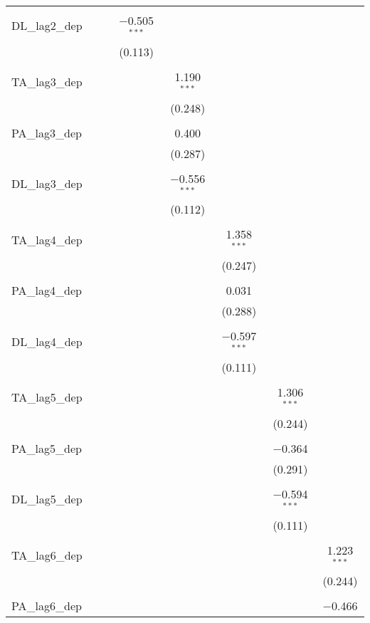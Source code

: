 \begin{table}[!htbp]
\begin{tabular}{@{\extracolsep{5pt}}lccccccc}
  & & & & & & & \\ 
 DL\_lag2\_dep &  &  & $-$0.505$^{***}$ &  &  &  &  \\ 
  &  &  & (0.113) &  &  &  &  \\ 
  & & & & & & & \\ 
 TA\_lag3\_dep &  &  &  & 1.190$^{***}$ &  &  &  \\ 
  &  &  &  & (0.248) &  &  &  \\ 
  & & & & & & & \\ 
 PA\_lag3\_dep &  &  &  & 0.400 &  &  &  \\ 
  &  &  &  & (0.287) &  &  &  \\ 
  & & & & & & & \\ 
 DL\_lag3\_dep &  &  &  & $-$0.556$^{***}$ &  &  &  \\ 
  &  &  &  & (0.112) &  &  &  \\ 
  & & & & & & & \\ 
 TA\_lag4\_dep &  &  &  &  & 1.358$^{***}$ &  &  \\ 
  &  &  &  &  & (0.247) &  &  \\ 
  & & & & & & & \\ 
 PA\_lag4\_dep &  &  &  &  & 0.031 &  &  \\ 
  &  &  &  &  & (0.288) &  &  \\ 
  & & & & & & & \\ 
 DL\_lag4\_dep &  &  &  &  & $-$0.597$^{***}$ &  &  \\ 
  &  &  &  &  & (0.111) &  &  \\ 
  & & & & & & & \\ 
 TA\_lag5\_dep &  &  &  &  &  & 1.306$^{***}$ &  \\ 
  &  &  &  &  &  & (0.244) &  \\ 
  & & & & & & & \\ 
 PA\_lag5\_dep &  &  &  &  &  & $-$0.364 &  \\ 
  &  &  &  &  &  & (0.291) &  \\ 
  & & & & & & & \\ 
 DL\_lag5\_dep &  &  &  &  &  & $-$0.594$^{***}$ &  \\ 
  &  &  &  &  &  & (0.111) &  \\ 
  & & & & & & & \\ 
 TA\_lag6\_dep &  &  &  &  &  &  & 1.223$^{***}$ \\ 
  &  &  &  &  &  &  & (0.244) \\ 
  & & & & & & & \\ 
 PA\_lag6\_dep &  &  &  &  &  &  & $-$0.466 \\ 

\end{tabular}
\end{table}
